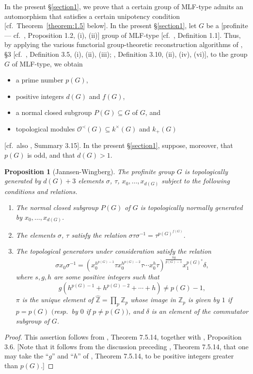 \documentclass[12pt,showkeys]{amsart}
\theoremstyle{theorem}
\newtheorem{prop}[theorem]{Proposition}
\theoremstyle{definition}
\def\bZ{{\mathbb Z}}
\def\CalO{{\mathcal O}}
\begin{document}
In the present \S \ref{section1}, we prove that a certain group of MLF-type admits an automorphism that
satisfies a certain unipotency condition [cf.\ Theorem~\ref{theorem:1.5}
below].
In the present \S \ref{section1}, let $G$ be a [profinite --- cf.\ \cite{Hoshi4}, Proposition 1.2, (i), (ii)] group of MLF-type [cf.\ \cite{Hoshi4}, Definition 1.1]. Thus, by applying the various functorial group-theoretic reconstruction algorithms of \cite{Hoshi1}, \S 3 [cf.\ \cite{Hoshi1}, Definition 3.5, (i), (ii), (iii); \cite{Hoshi1}, Definition 3.10, (ii), (iv), (vi)], to  the group $G$ of MLF-type, we obtain
\begin{itemize}
  \item a prime number $p(G)$,
  \item positive integers $d(G)$ and $f(G)$, 
  \item a normal closed subgroup $P(G) \subseteq G$ of $G$, and
  \item topological modules $\CalO^{\prec}(G) \subseteq k^\times (G)$ and $k_+(G)$ 
\end{itemize}
[cf.\ also \cite{Hoshi1}, Summary 3.15]. 
In the present \S \ref{section1}, suppose, moreover, that $p(G)$ is odd, and that $d(G) > 1$. 

\begin{prop}[Jannsen-Wingberg]\label{proposition:1.1} 
The profinite group $G$ is topologically generated by $d(G)+3$ elements $\sigma$, $\tau$, $x_0, \dots, x_{d(G)}$ subject to the following conditions and relations.

\begin{enumerate}[label=(\roman*),ref=(\roman*)]
  \item[\rm (1)] The normal closed subgroup $P(G)$ of $G$ is topologically normally generated by $x_0, \dots, x_{d(G)}$.
  \item[\rm (2)] The elements $\sigma$, $\tau$ satisfy the relation $\sigma \tau \sigma^{-1} = \tau^{p(G)^{f(G)}}$.
  \item[\rm (3)] The topological generators under consideration satisfy the relation 
\[
\sigma x_0 \sigma^{-1}
=
(x^{h^{{p(G)}-1}}_0 \tau x^{h^{{p(G)}-2}}_0 \tau \cdots x^{h}_0 \tau)^{\frac{\pi g}{{p(G)}-1}}
x_1^{p(G)^{s}}
\delta ,
\]
where $s, g, h$ are some positive integers such that 
\[
g(h^{p(G) - 1} + h^{p(G) - 2} + \cdots + h) \neq p(G) - 1, 
\]
$\pi$ is the unique element of $\hat{\bZ} = \prod_p \bZ_p$ whose image in $\bZ_p$ is given by $1$ if $p = p(G)$ $($resp.\ by $0$ if $p\neq p(G)$$)$, and $\delta$ is an element of the commutator subgroup of $G$.  
\end{enumerate}
\end{prop}
\begin{proof}
This assertion follows from \cite{NSW}, Theorem 7.5.14, together with \cite{Hoshi1}, Proposition 3.6. [Note that it follows from the discussion preceding \cite{NSW}, Theorem 7.5.14, that one may take the ``$g$'' and ``$h$'' of \cite{NSW}, Theorem 7.5.14, to be positive integers greater than $p(G)$.]  
\end{proof}
\end{document}
